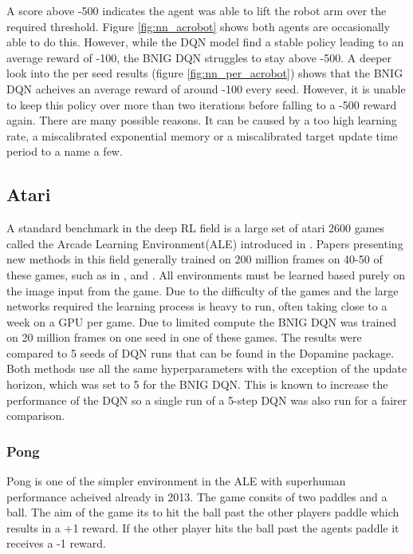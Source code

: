 A score above -500 indicates the agent was able to lift the robot arm over the required threshold. Figure \ref{fig:nn_acrobot} shows both agents are occasionally able to do this. However, while the DQN model find a stable policy leading to an average reward of -100, the BNIG DQN struggles to stay above -500. A deeper look into the per seed results (figure \ref{fig:nn_per_acrobot}) shows that the BNIG DQN acheives an average reward of around -100 every seed. However, it is unable to keep this policy over more than two iterations before falling to a -500 reward again. There are many possible reasons. It can be caused by a too high learning rate, a miscalibrated exponential memory or a miscalibrated target update time period to a name a few.

\subsection{Atari}

A standard benchmark in the deep RL field is a large set of atari 2600 games called the Arcade Learning Environment(ALE) introduced in \cite{bellemare_2013}. Papers presenting new methods in this field generally trained on 200 million frames on 40-50 of these games, such as in \cite{mnih_2015}, \cite{mnih_2016} and \cite{donoghue_2017}. All environments must be learned based purely on the image input from the game. Due to the difficulty of the games and the large networks required the learning process is heavy to run, often taking close to a week on a GPU per game. Due to limited compute the BNIG DQN was trained on 20 million frames on one seed in one of these games. The results were compared to 5 seeds of DQN runs that can be found in the Dopamine package. Both methods use all the same hyperparameters with the exception of the update horizon, which was set to 5 for the BNIG DQN. This is known to increase the performance of the DQN so a single run of a 5-step DQN was also run for a fairer comparison.

\subsubsection{Pong}

Pong is one of the simpler environment in the ALE with superhuman performance acheived already in 2013\citep{mnih_2013}. The game consits of two paddles and a ball. The aim of the game its to hit the ball past the other players paddle which results in a +1 reward. If the other player hits the ball past the agents paddle it receives a -1 reward. 

